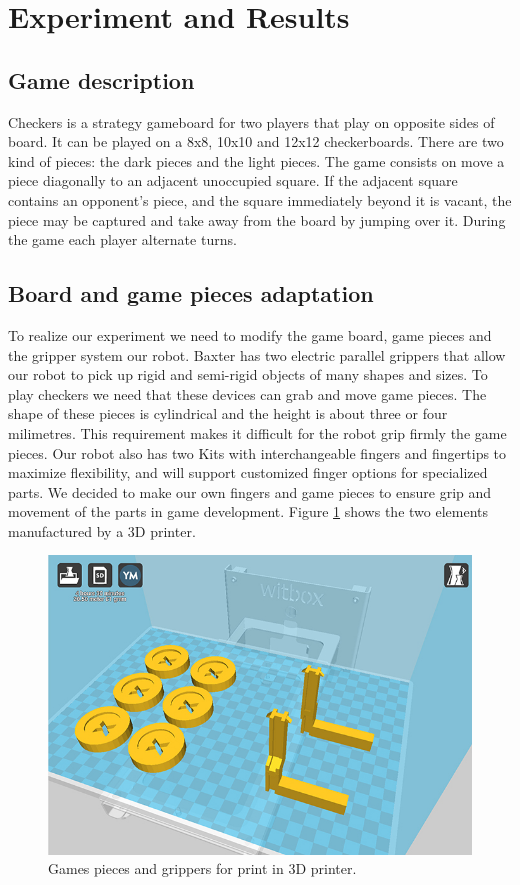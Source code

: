 \documentclass[journal,twoside]{JoPhA}
\begin{document}
\section{Experiment and Results}
\label{sec:experiment}

\subsection{Game description}

Checkers is a strategy gameboard for two players that play on opposite sides of board. It can be played on a 8x8, 10x10 and 12x12 checkerboards.
There are two kind of pieces: the dark pieces and the light pieces. 
The game consists on move a piece diagonally to an adjacent unoccupied square. If the adjacent square contains an opponent's piece, and the square immediately beyond it is vacant, the piece may be captured and take away from the board by jumping over it. During the game each player alternate turns.

\subsection{Board and game pieces adaptation}

To realize our experiment we need to modify the game board, game pieces and the gripper system our robot.
Baxter has two electric parallel grippers that allow our robot to pick up rigid and semi-rigid objects of many shapes and sizes. To play checkers we need that these devices can grab and move game pieces. The shape of these pieces is cylindrical and the height is about three or four milimetres. This requirement makes it difficult for the robot grip firmly the game pieces. Our robot also has two Kits with interchangeable fingers and fingertips to maximize flexibility, and will support customized finger options for specialized parts. We decided to make our own fingers and game pieces to ensure grip and movement of the parts in game development. Figure \ref{3Dprinter} shows the two elements manufactured by a 3D printer.

\begin{figure}[h]
\centering
\includegraphics[scale=0.35]{Images/print_3D_2.jpg} 
\caption{\label{3Dprinter}Games pieces and grippers for print in 3D printer.}
\end{figure}
\end{document}
